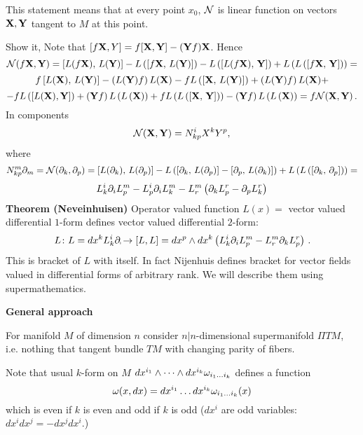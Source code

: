 \m

This statement means that at every point $x_0$,
 ${\cal N}$ is linear function
on vectors ${\bf X},{\bf Y}$ tangent to $M$ at this point. 


 Show it,  Note that 
  $[f{\bf X},Y]=f[{\bf X},{\bf Y}]-({\bf Y} f){\bf X}$. Hence
         $$
  {\cal N}(f{\bf X},{\bf Y})=\left[L(f{\bf X}),\,L({\bf Y})\right]-
                    L\left(\left[f{\bf X},\,L({\bf Y})\right]\right)-
                   L\left(\left[L(f{\bf X}),\,{\bf Y}\right]\right)+
                      L\left(
                    L\left(
              \left[f{\bf X},\,{\bf Y}\right]
                    \right)
                     \right)
=
               $$ 
               $$
          f\left[L({\bf X}),\,L({\bf Y})\right]-\left(L({\bf Y})f\right)L({\bf X})
      -fL\left(\left[{\bf X},\,L({\bf Y})\right]\right)+\left(L({\bf Y})f\right)L({\bf X})+
            $$
            $$
          -fL\left(
             \left[L({\bf X}),{\bf Y}\right]
                    \right)+
                \left({\bf Y} f\right)L\left(L\left({\bf X}\right)\right)
                +f L\left(
                    L\left(
              \left[{\bf X},\,{\bf Y}\right]
                    \right)
                     \right)-
     \left({\bf Y} f\right)L\left(L\left({\bf X}\right)\right)
             =f{\cal N}({\bf X},{\bf Y})\,.
                    $$
In components
        $$
{\cal N}({\bf X},{\bf Y})=N^i_{kp}X^kY^p, 
        $$
where $$
N^m_{kp}\partial_m={\cal N}(\partial_k,\partial_p)=\left[L(\partial_k),\,L(\partial_p)\right]-
                    L\left(
              \left[\partial_k,\,L(\partial_p)\right]-\left[\partial_p,\,L(\partial_k)\right]
                    \right)+
                      L\left(
                    L\left(
              \left[\partial_k,\,\partial_p\right]
                    \right)
                     \right)=
           $$
            $$
     L^i_k\partial_i L^m_p-L^i_p\partial_i L^m_k-
      L^m_r\left(\partial_kL_p^r-\partial_p L_k^r\right)
           $$
{\bf Theorem (Neveinhuisen)} Operator valued function $L(x)=$
  vector valued differential $1$-form  defines
  vector valued differential $2$-form:
  $$
  L\colon L=dx^kL_k^i\partial_\mapsto [L,L]=dx^p\wedge dx^k
      \left(L^i_k\partial_i L^m_p-
      L^m_r\partial_kL_p^r
\right)\,. 
            $$ 
  This is  bracket of $L$ with itself.
In fact Nijenhuis defines bracket for vector fields valued 
in differential forms of arbitrary rank.
  We will describe them using supermathematics.

     \centerline  {\bf General approach}

  For  manifold $M$ of dimension $n$ consider $n|n$-dimensional
supermanifold $\Pi TM$, i.e. nothing that tangent bundle $TM$ with
changing parity of fibers.

    Note that usual $k$-form on $M$ 
$dx^{i_1}\wedge\dots\wedge dx^{i_k}\omega_{i_1\dots i_k}$ defines a function
            $$
    \omega(x,dx)=dx^{i_1}\dots dx^{i_k}\omega_{i_1\dots i_k}(x)
            $$
 which is even if $k$ is even and odd if $k$ is odd
($dx^i$ are odd variables: $dx^idx^j=-dx^jdx^i$.)

